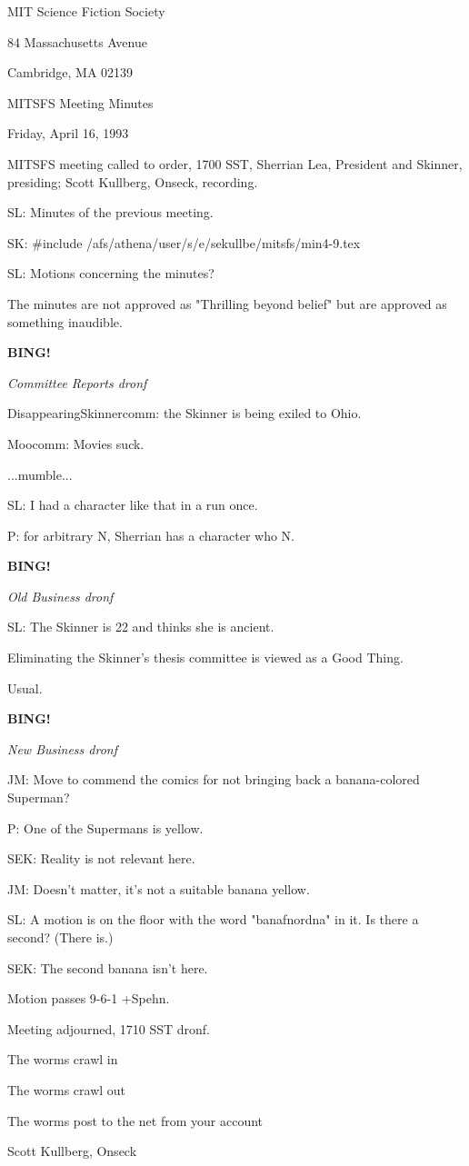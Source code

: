 \documentclass[12pt]{article}
\newcommand{\bing}{{\bf BING!} }
\newcommand{\goto}[1]{\bing \vskip 12pt \centerline{{\em{#1}}}}
\begin{document}
\begin{center}

MIT Science Fiction Society 

84 Massachusetts Avenue

Cambridge, MA 02139

\vspace{12pt}

MITSFS Meeting Minutes 

Friday, April 16, 1993

\end{center}
 
\vspace{18pt}

\setlength{\parskip}{6pt}

\noindent
MITSFS meeting called to order, 1700 SST,
Sherrian Lea, President and Skinner, presiding; Scott Kullberg, Onseck, recording.

SL: Minutes of the previous meeting.

SK: #include /afs/athena/user/s/e/sekullbe/mitsfs/min4-9.tex

SL: Motions concerning the minutes?

The minutes are not approved as "Thrilling beyond belief" but are approved as something inaudible.

\goto{Committee Reports dronf}

DisappearingSkinnercomm: the Skinner is being exiled to Ohio.

Moocomm: Movies suck.

...mumble...

SL: I had a character like that in a run once.

P: for arbitrary N, Sherrian has a character who N.

\goto{Old Business dronf}

SL: The Skinner is 22 and thinks she is ancient.

Eliminating the Skinner's thesis committee is viewed as a Good Thing.

Usual.

\goto{New Business dronf}

JM: Move to commend the comics for not bringing back a banana-colored Superman?

P: One of the Supermans is yellow.

SEK: Reality is not relevant here.

JM: Doesn't matter, it's not a suitable banana yellow.

SL: A motion is on the floor with the word "banafnordna" in it. Is there a second? (There is.)

SEK: The second banana isn't here.

Motion passes 9-6-1 +Spehn.

\vspace{12pt}

\noindent
Meeting adjourned, 1710 SST dronf.

\vspace{18pt}

\centerline{The worms crawl in}
\centerline{The worms crawl out}
\centerline{The worms post to the net from your account}
\centerline{Scott Kullberg, Onseck}
\end{document}
